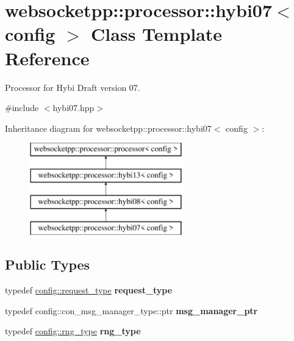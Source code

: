 \hypertarget{classwebsocketpp_1_1processor_1_1hybi07}{}\section{websocketpp\+:\+:processor\+:\+:hybi07$<$ config $>$ Class Template Reference}
\label{classwebsocketpp_1_1processor_1_1hybi07}


Processor for Hybi Draft version 07.  




{\ttfamily \#include $<$hybi07.\+hpp$>$}

Inheritance diagram for websocketpp\+:\+:processor\+:\+:hybi07$<$ config $>$\+:\begin{figure}[H]
\begin{center}
\leavevmode
\includegraphics[height=4.000000cm]{classwebsocketpp_1_1processor_1_1hybi07}
\end{center}
\end{figure}
\subsection*{Public Types}
\begin{DoxyCompactItemize}
\item 
typedef \hyperlink{classwebsocketpp_1_1http_1_1parser_1_1request}{config\+::request\+\_\+type} {\bfseries request\+\_\+type}\hypertarget{classwebsocketpp_1_1processor_1_1hybi07_ae8e3aeed4b4d6d67c8af5dccf70d468d}{}\label{classwebsocketpp_1_1processor_1_1hybi07_ae8e3aeed4b4d6d67c8af5dccf70d468d}

\item 
typedef config\+::con\+\_\+msg\+\_\+manager\+\_\+type\+::ptr {\bfseries msg\+\_\+manager\+\_\+ptr}\hypertarget{classwebsocketpp_1_1processor_1_1hybi07_abfa0723364d644f3320141ade624fc8e}{}\label{classwebsocketpp_1_1processor_1_1hybi07_abfa0723364d644f3320141ade624fc8e}

\item 
typedef \hyperlink{classwebsocketpp_1_1random_1_1none_1_1int__generator}{config\+::rng\+\_\+type} {\bfseries rng\+\_\+type}\hypertarget{classwebsocketpp_1_1processor_1_1hybi07_afb0db8323385a430df83372ce5b29bc2}{}\label{classwebsocketpp_1_1processor_1_1hybi07_afb0db8323385a430df83372ce5b29bc2}

\end{DoxyCompactItemize}
